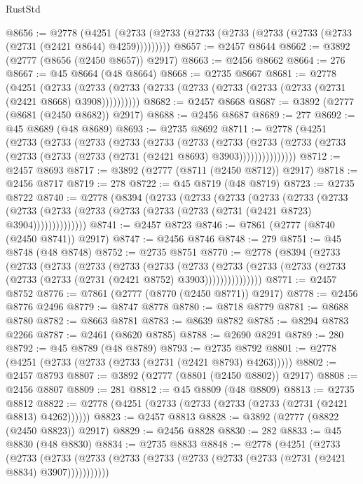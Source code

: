 \begin{lexlean}{RustStd}
\begin{coremodule}
@8656 := @2778
    (@4251 (@2733 (@2733 (@2733 (@2733 (@2733 (@2733 (@2733 (@2731 (@2421 @8644) @4259)))))))))
@8657 := @2457 @8644
@8662 := @3892 (@2777 (@8656 (@2450 @8657)) @2917)
@8663 := @2456 @8662
@8664 := 276
@8667 := @45 @8664 (@48 @8664)
@8668 := @2735 @8667
@8681 := @2778
    (@4251
      (@2733 (@2733 (@2733 (@2733 (@2733 (@2733 (@2733 (@2733 (@2731 (@2421 @8668) @3908))))))))))
@8682 := @2457 @8668
@8687 := @3892 (@2777 (@8681 (@2450 @8682)) @2917)
@8688 := @2456 @8687
@8689 := 277
@8692 := @45 @8689 (@48 @8689)
@8693 := @2735 @8692
@8711 := @2778
    (@4251
      (@2733
        (@2733
          (@2733
            (@2733
              (@2733
                (@2733
                  (@2733
                    (@2733
                      (@2733 (@2733 (@2733 (@2733 (@2733 (@2731 (@2421 @8693) @3903)))))))))))))))
@8712 := @2457 @8693
@8717 := @3892 (@2777 (@8711 (@2450 @8712)) @2917)
@8718 := @2456 @8717
@8719 := 278
@8722 := @45 @8719 (@48 @8719)
@8723 := @2735 @8722
@8740 := @2778
    (@8394
      (@2733
        (@2733
          (@2733
            (@2733
              (@2733
                (@2733
                  (@2733 (@2733 (@2733 (@2733 (@2733 (@2733 (@2731 (@2421 @8723) @3904))))))))))))))
@8741 := @2457 @8723
@8746 := @7861 (@2777 (@8740 (@2450 @8741)) @2917)
@8747 := @2456 @8746
@8748 := 279
@8751 := @45 @8748 (@48 @8748)
@8752 := @2735 @8751
@8770 := @2778
    (@8394
      (@2733
        (@2733
          (@2733
            (@2733
              (@2733
                (@2733
                  (@2733
                    (@2733
                      (@2733 (@2733 (@2733 (@2733 (@2733 (@2731 (@2421 @8752) @3903)))))))))))))))
@8771 := @2457 @8752
@8776 := @7861 (@2777 (@8770 (@2450 @8771)) @2917)
@8778 := @2456 @8776 @2496
@8779 := @8747 @8778
@8780 := @8718 @8779
@8781 := @8688 @8780
@8782 := @8663 @8781
@8783 := @8639 @8782
@8785 := @8294 @8783 @2266
@8787 := @2461 (@8620 @8785)
@8788 := @2690 @8291
@8789 := 280
@8792 := @45 @8789 (@48 @8789)
@8793 := @2735 @8792
@8801 := @2778 (@4251 (@2733 (@2733 (@2733 (@2731 (@2421 @8793) @4263)))))
@8802 := @2457 @8793
@8807 := @3892 (@2777 (@8801 (@2450 @8802)) @2917)
@8808 := @2456 @8807
@8809 := 281
@8812 := @45 @8809 (@48 @8809)
@8813 := @2735 @8812
@8822 := @2778 (@4251 (@2733 (@2733 (@2733 (@2733 (@2731 (@2421 @8813) @4262))))))
@8823 := @2457 @8813
@8828 := @3892 (@2777 (@8822 (@2450 @8823)) @2917)
@8829 := @2456 @8828
@8830 := 282
@8833 := @45 @8830 (@48 @8830)
@8834 := @2735 @8833
@8848 := @2778
    (@4251
      (@2733
        (@2733
          (@2733 (@2733 (@2733 (@2733 (@2733 (@2733 (@2733 (@2731 (@2421 @8834) @3907)))))))))))

\end{coremodule}
\end{lexlean}
